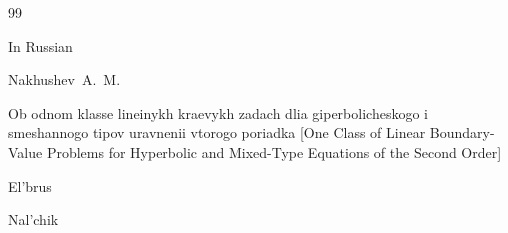 \begin{thebibliography}{99}

\lang In Russian

\by Nakhushev~A.~M.

\book Ob odnom klasse lineinykh kraevykh zadach dlia giperbolicheskogo i smeshannogo tipov uravnenii vtorogo poriadka \rm [One Class of Linear Boundary-Value Problems for Hyperbolic and Mixed-Type Equations of the Second Order]


\publ El'brus

\publaddr Nal'chik








\end{thebibliography}



\EngDate





\newpage

\Russian





%

